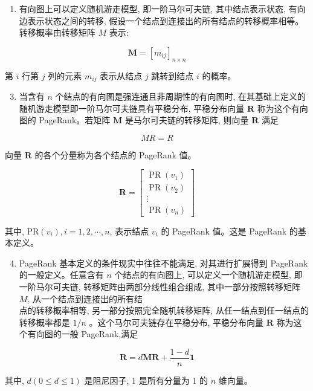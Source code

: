\documentclass[10pt]{article}
\begin{document}
\begin{CJK*}{UTF8}{bsmi}
\begin{enumerate}
  \item 有向图上可以定义随机游走模型, 即一阶马尔可夫链, 其中结点表示状态, 有向边表示状态之间的转移, 假设一个结点到连接出的所有结点的转移概率相等。转移概率由转移矩阵 $M$ 表示:

\end{enumerate}

$$
\boldsymbol{M}=\left[m_{i j}\right]_{n \times n}
$$

第 $i$ 行第 $j$ 列的元素 $m_{i j}$ 表示从结点 $j$ 跳转到结点 $i$ 的概率。

\begin{enumerate}
  \setcounter{enumi}{2}
  \item 当含有 $n$ 个结点的有向图是强连通且非周期性的有向图时, 在其基础上定义的随机游走模型即一阶马尔可夫链具有平稳分布, 平稳分布向量 $\boldsymbol{R}$ 称为这个有向图的 PageRank。若矩阵 $\boldsymbol{M}$ 是马尔可夫链的转移矩阵, 则向量 $\boldsymbol{R}$ 满足
\end{enumerate}

$$
M R=R
$$

向量 $\boldsymbol{R}$ 的各个分量称为各个结点的 PageRank 值。

$$
\boldsymbol{R}=\left[\begin{array}{c}
\operatorname{PR}\left(v_{1}\right) \\
\operatorname{PR}\left(v_{2}\right) \\
\vdots \\
\operatorname{PR}\left(v_{n}\right)
\end{array}\right]
$$

其中, $\mathrm{PR}\left(v_{i}\right), i=1,2, \cdots, n$, 表示结点 $v_{i}$ 的 PageRank 值。这是 PageRank 的基本定义。

\begin{enumerate}
  \setcounter{enumi}{3}
  \item PageRank 基本定义的条件现实中往往不能满足, 对其进行扩展得到 PageRank 的一般定义。任意含有 $n$ 个结点的有向图上, 可以定义一个随机游走模型, 即一阶马尔可夫链, 转移矩阵由两部分线性组合组成, 其中一部分按照转移矩阵 $M$, 从一个结点到连接出的所有结\\
点的转移概率相等, 另一部分按照完全随机转移矩阵, 从任一结点到任一结点的转移概率都是 $1 / n$ 。这个马尔可夫链存在平稳分布, 平稳分布向量 $\boldsymbol{R}$ 称为这个有向图的一般 PageRank,满足
\end{enumerate}

$$
\boldsymbol{R}=d \boldsymbol{M} \boldsymbol{R}+\frac{1-d}{n} \boldsymbol{1}
$$

其中, $d(0 \leqslant d \leqslant 1)$ 是阻尼因子, 1 是所有分量为 1 的 $n$ 维向量。


\end{CJK*}
\end{document}
